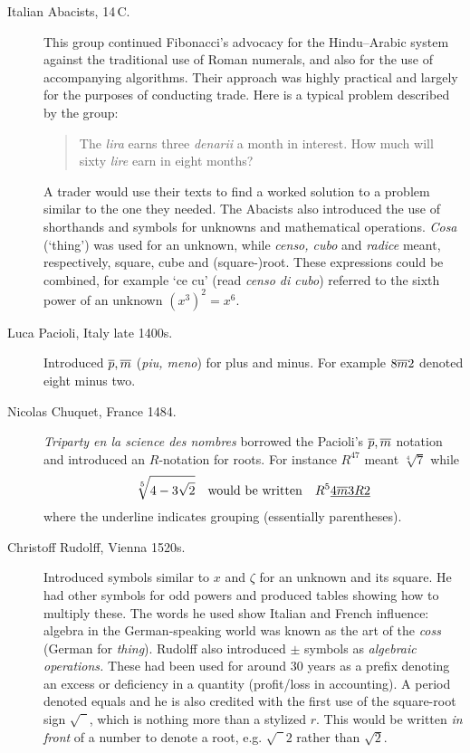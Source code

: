 \begin{description}
\item[Italian Abacists, 14\th\,C.] This group continued Fibonacci's advocacy for the Hindu--Arabic system against the traditional use of Roman numerals, and also for the use of accompanying algorithms. Their approach was highly practical and largely for the purposes of conducting trade. Here is a typical problem described by the group:
  \begin{quote}
  The \emph{lira} earns three \emph{denarii} a month in interest. How much will sixty \emph{lire} earn in eight months?
  \end{quote}
  A trader would use their texts to find a worked solution to a problem similar to the one they needed. The Abacists also introduced the use of shorthands and symbols for unknowns and mathematical operations. \emph{Cosa} (`thing') was used for an unknown, while \emph{censo, cubo} and \emph{radice} meant, respectively, square, cube and (square-)root. These expressions could be combined, for example `ce cu' (read \emph{censo di cubo}) referred to the sixth power of an unknown $(x^3)^2=x^6$.
  
  \item[Luca Pacioli, Italy late 1400s.] Introduced $\overline{p},\overline{m}$ (\emph{piu, meno}) for plus and minus. For example $8\overline{m} 2$ denoted eight minus two. 
  
  \item[Nicolas Chuquet, France 1484.] \emph{Triparty en la science des nombres} borrowed the Pacioli's $\overline{p},\overline{m}$ notation and introduced an $R$-notation for roots. For instance $R^47$ meant $\sqrt[4]7$ while
  \[\sqrt[5]{4-3\sqrt 2}\quad\text{would be written}\quad R^5\underline{4\overline{m}3R2}\]
  where the underline indicates grouping (essentially parentheses).
  
	\item[Christoff Rudolff, Vienna 1520s.] Introduced symbols similar to $x$ and $\zeta$ for an unknown and its square. He had other symbols for odd powers and produced tables showing how to multiply these. The words he used show Italian and French influence: algebra in the German-speaking world was known as the art of the \emph{coss} (German for \emph{thing}). Rudolff also introduced $\pm$ symbols as \emph{algebraic operations.} These had been used for around 30 years as a prefix denoting an excess or deficiency in a quantity (profit/loss in accounting). A period denoted equals and he is also credited with the first use of the square-root sign $\sqrt{\phantom 1\!\!}$, which is nothing more than a stylized $r$. This would be written \emph{in front} of a number to denote a root, e.g. $\sqrt{\phantom 1\!\!}2$ rather than $\sqrt 2$.
	

\end{description}
